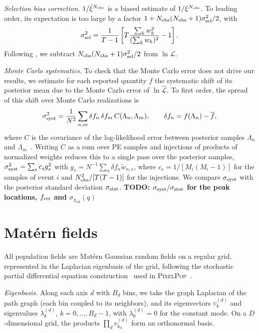 \documentclass[%
 reprint,
 amsmath,amssymb,
 aps,
 prl,
 nofootinbib,nobibnotes,
 floatfix,
]{revtex4-2}
\newcommand{\chieff}{\ensuremath{\chi_{\mathrm{eff}}}}
\newcommand{\todo}[1]{{\color{Blue}\bf TODO: #1}}
\newcommand{\PixelPop}{\textsc{PixelPop}\xspace}
\begin{document}
\textit{Selection bias correction.} $1/\hat{\xi}^{N_{\rm obs}}$ is a biased estimate of $1/\xi^{N_{\rm obs}}$. To leading order, its expectation is too large by a factor $1 + N_{\rm obs}(N_{\rm obs} + 1)\sigma_{\rm sel}^2/2$, with
\begin{equation}
    \sigma_{\rm sel}^2 = \frac{1}{T - 1}\left[T\frac{\sum_k w_k^2}{(\sum_k w_k)^2} - 1\right].
\end{equation}
Following \citet{Heinzel:2025ogf}, we subtract $N_{\rm obs}(N_{\rm obs} + 1)\sigma^2_{\rm sel}/2$ from $\ln \mathcal{L}$.

\textit{Monte Carlo systematics.} To check that the Monte Carlo error does not drive our results, we estimate for each reported quantity $f$ the systematic shift of its posterior mean due to the Monte Carlo error of $\ln \hat{\mathcal{L}}$. To first order, the spread of this shift over Monte Carlo realizations is
\begin{equation}
    \sigma^2_{\rm syst} = \frac{1}{N^2} \sum_{n, m} \delta f_n\, \delta f_m\, C(\Lambda_n, \Lambda_m), \qquad \delta f_n = f(\Lambda_n) - \overline{f},
\end{equation}
where $C$ is the covariance of the log-likelihood error between posterior samples $\Lambda_n$ and $\Lambda_m$~\cite{Heinzel:2025ogf}. Writing $C$ as a sum over \ac{PE} samples and injections of products of normalized weights reduces this to a single pass over the posterior samples, $\sigma^2_{\rm syst} = \sum_s c_s g_s^2$ with $g_s = N^{-1}\sum_n \delta f_n \tilde{w}_{n, s}$, where $c_s = 1/[M_i(M_i - 1)]$ for the samples of event $i$ and $N_{\rm obs}^2/[T(T - 1)]$ for the injections. We compare $\sigma_{\rm syst}$ with the posterior standard deviation $\sigma_{\rm stat}$. \todo{$\sigma_{\rm syst}/\sigma_{\rm stat}$ for the peak locations, $f_{\rm ret}$ and $\sigma_{\chieff}(q)$}

\section{Mat\'ern fields}
\label{sm: fields}

All population fields are Mat\'ern Gaussian random fields on a regular grid, represented in the Laplacian eigenbasis of the grid, following the stochastic partial differential equation construction~\cite{Whittle:1954abc, lindgren_explicit_2011} used in \PixelPop~\cite{Heinzel:2024jlc}.

\textit{Eigenbasis.} Along each axis $d$ with $B_d$ bins, we take the graph Laplacian of the path graph (each bin coupled to its neighbors), and its eigenvectors $v^{(d)}_k$ and eigenvalues $\lambda^{(d)}_k$, $k = 0, \dots, B_d - 1$, with $\lambda^{(d)}_0 = 0$ for the constant mode. On a $D$-dimensional grid, the products $\prod_d v^{(d)}_{k_d}$ form an orthonormal basis.
\end{document}
